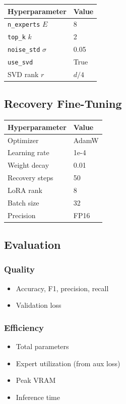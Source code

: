 \begin{table}[H]
\centering
\small
\begin{tabular}{ll}
\toprule
\textbf{Hyperparameter} & \textbf{Value} \\
\midrule
\texttt{n\_experts} $E$ & 8 \\
\texttt{top\_k} $k$ & 2 \\
\texttt{noise\_std} $\sigma$ & 0.05 \\
\texttt{use\_svd} & True \\
SVD rank $r$ & $d/4$ \\
\bottomrule
\end{tabular}
\end{table}

\subsection{Recovery Fine-Tuning}

\begin{table}[H]
\centering
\small
\begin{tabular}{ll}
\toprule
\textbf{Hyperparameter} & \textbf{Value} \\
\midrule
Optimizer & AdamW \\
Learning rate & 1e-4 \\
Weight decay & 0.01 \\
Recovery steps & 50 \\
LoRA rank & 8 \\
Batch size & 32 \\
Precision & FP16 \\
\bottomrule
\end{tabular}
\end{table}

\subsection{Evaluation}

\subsubsection{Quality}
\begin{itemize}
\item Accuracy, F1, precision, recall
\item Validation loss

\end{itemize}
\subsubsection{Efficiency}
\begin{itemize}
\item Total parameters
\item Expert utilization (from aux loss)
\item Peak VRAM
\item Inference time

\end{itemize}
